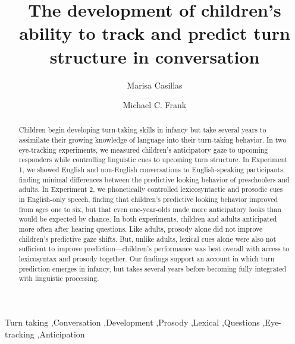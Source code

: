 \documentclass[authoryear, 12pt]{elsarticle}
\begin{document}
\begin{frontmatter}

\title{The development of children's ability to track and predict turn structure in conversation}

\author[MPI]{Marisa Casillas}
\address[MPI]{Max Planck Institute for Psycholinguistics, Nijmegen}

\author[StanfordPSY]{Michael C. Frank}

\address[StanfordPSY]{Department of Psychology, Stanford University}

\begin{abstract}
Children begin developing turn-taking skills in infancy but take several years to assimilate their growing knowledge of language into their turn-taking behavior. In two eye-tracking experiments, we measured children's anticipatory gaze to upcoming responders while controlling linguistic cues to upcoming turn structure. In Experiment 1, we showed English and non-English conversations to English-speaking participants, finding minimal differences between the predictive looking behavior of preschoolers and adults. In Experiment 2, we phonetically controlled lexicosyntactic and prosodic cues in English-only speech, finding that children's predictive looking behavior improved from ages one to six, but that even one-year-olds made more anticipatory looks than would be expected by chance. In both experiments, children and adults anticipated more often after hearing questions. Like adults, prosody alone did not improve children's predictive gaze shifts. But, unlike adults, lexical cues alone were also not sufficient to improve prediction---children's performance was best overall with access to lexicosyntax and prosody together. Our findings support an account in which turn prediction emerges in infancy, but takes several years before becoming fully integrated with linguistic processing. 
\end{abstract}

\begin{keyword}
Turn taking \sep Conversation \sep Development \sep Prosody \sep Lexical \sep Questions \sep Eye-tracking \sep Anticipation

\end{keyword}

\end{frontmatter}
\end{document}
